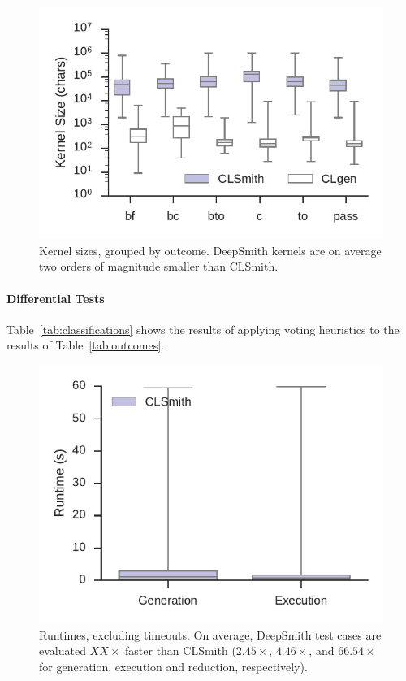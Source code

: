 \begin{figure}
	\centering %
	\includegraphics[width=\columnwidth]{build/img/kernel-sizes}%
	\caption{%
		Kernel sizes, grouped by outcome. DeepSmith kernels are on average two orders of magnitude smaller than CLSmith.%
	}%
	\label{fig:kernel-sizes} %
\end{figure}


\paragraph{Differential Tests}

Table~\ref{tab:classifications} shows the results of applying voting heuristics to the results of Table~\ref{tab:outcomes}.

\begin{figure}
	\centering %
	\includegraphics[width=\columnwidth]{build/img/runtimes}%
	\caption{%
		Runtimes, excluding timeouts. On average, DeepSmith test cases are evaluated $XX\times$ faster than CLSmith ($2.45\times$, $4.46\times$, and $66.54\times$ for generation, execution and reduction, respectively).%
	}%
	\label{fig:runtimes} %
\end{figure}


